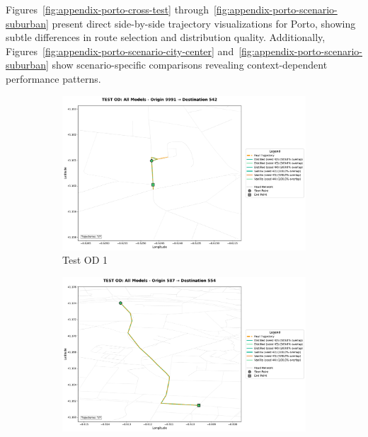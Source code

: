 Figures~\ref{fig:appendix-porto-cross-test} through~\ref{fig:appendix-porto-scenario-suburban} present direct side-by-side trajectory visualizations for Porto, showing subtle differences in route selection and distribution quality. Additionally, Figures~\ref{fig:appendix-porto-scenario-city-center} and~\ref{fig:appendix-porto-scenario-suburban} show scenario-specific comparisons revealing context-dependent performance patterns.

\begin{figure}[H]
    \centering
    \begin{subfigure}{0.49\linewidth}
        \centering
        \includegraphics[width=\linewidth]{assets/plots/eval/porto/cross_model/test/test_od_comparison_1_origin9991_dest542.pdf}
        \caption{Test OD 1}
    \end{subfigure}
    \begin{subfigure}{0.49\linewidth}
        \centering
        \includegraphics[width=\linewidth]{assets/plots/eval/porto/cross_model/test/test_od_comparison_3_origin587_dest554.pdf}

\end{subfigure}
\end{figure}
